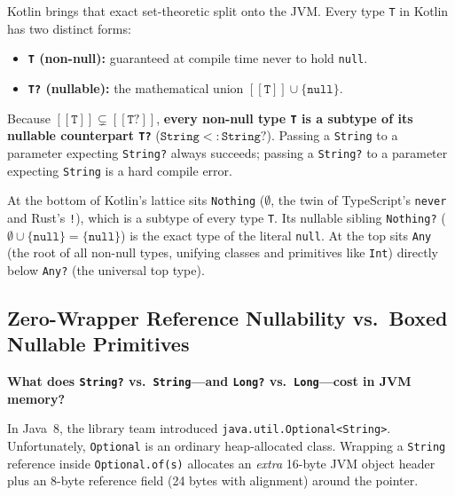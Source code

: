 Kotlin brings that exact set-theoretic split onto the JVM. Every type \texttt{T} in Kotlin has two distinct forms:
\begin{itemize}
  \item \textbf{\texttt{T} (non-null):} guaranteed at compile time never to hold \texttt{null}.
  \item \textbf{\texttt{T?} (nullable):} the mathematical union $[\![ \texttt{T} ]\!] \cup \{\texttt{null}\}$.
\end{itemize}
Because $[\![ \texttt{T} ]\!] \subsetneq [\![ \texttt{T?} ]\!]$, \textbf{every non-null type \texttt{T} is a subtype of its nullable counterpart \texttt{T?}} ($\texttt{String} <: \texttt{String?}$). Passing a \texttt{String} to a parameter expecting \texttt{String?} always succeeds; passing a \texttt{String?} to a parameter expecting \texttt{String} is a hard compile error.

At the bottom of Kotlin's lattice sits \texttt{Nothing} ($\emptyset$, the twin of TypeScript's \texttt{never} and Rust's \texttt{!}), which is a subtype of every type \texttt{T}. Its nullable sibling \texttt{Nothing?} ($\emptyset \cup \{\texttt{null}\} = \{\texttt{null}\}$) is the exact type of the literal \texttt{null}. At the top sits \texttt{Any} (the root of all non-null types, unifying classes and primitives like \texttt{Int}) directly below \texttt{Any?} (the universal top type).

\subsection{Zero-Wrapper Reference Nullability vs.\ Boxed Nullable Primitives}

\textbf{What does \texttt{String?} vs.\ \texttt{String}---and \texttt{Long?} vs.\ \texttt{Long}---cost in JVM memory?}

In Java~8, the library team introduced \texttt{java.\allowbreak{}util.\allowbreak{}Optional<String>}. Unfortunately, \texttt{Optional} is an ordinary heap-allocated class. Wrapping a \texttt{String} reference inside \texttt{Optional.of(s)} allocates an \emph{extra} 16-byte JVM object header plus an 8-byte reference field (24 bytes with alignment) around the pointer.

